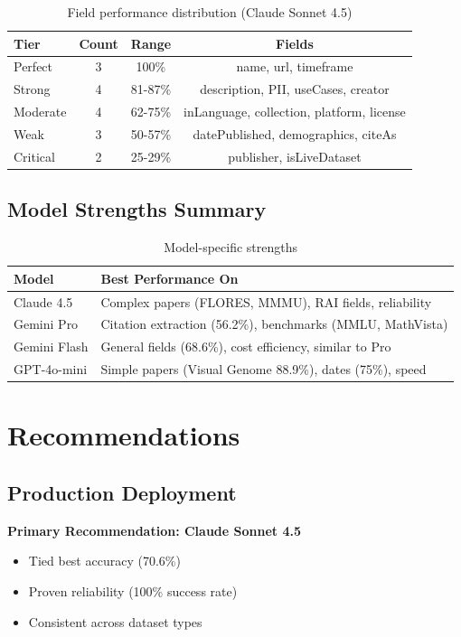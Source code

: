 \documentclass[11pt,a4paper]{article}
\begin{document}
\begin{table}[h]
\centering
\begin{tabular}{lccc}
\toprule
\textbf{Tier} & \textbf{Count} & \textbf{Range} & \textbf{Fields} \\
\midrule
Perfect & 3 & 100\% & name, url, timeframe \\
Strong & 4 & 81-87\% & description, PII, useCases, creator \\
Moderate & 4 & 62-75\% & inLanguage, collection, platform, license \\
Weak & 3 & 50-57\% & datePublished, demographics, citeAs \\
Critical & 2 & 25-29\% & publisher, isLiveDataset \\
\bottomrule
\end{tabular}
\caption{Field performance distribution (Claude Sonnet 4.5)}
\end{table}

\subsection{Model Strengths Summary}

\begin{table}[h]
\centering
\begin{tabular}{lp{10cm}}
\toprule
\textbf{Model} & \textbf{Best Performance On} \\
\midrule
Claude 4.5 & Complex papers (FLORES, MMMU), RAI fields, reliability \\
Gemini Pro & Citation extraction (56.2\%), benchmarks (MMLU, MathVista) \\
Gemini Flash & General fields (68.6\%), cost efficiency, similar to Pro \\
GPT-4o-mini & Simple papers (Visual Genome 88.9\%), dates (75\%), speed \\
\bottomrule
\end{tabular}
\caption{Model-specific strengths}
\end{table}

\section{Recommendations}

\subsection{Production Deployment}

\textbf{Primary Recommendation: Claude Sonnet 4.5}
\begin{itemize}
    \item Tied best accuracy (70.6\%)
    \item Proven reliability (100\% success rate)
    \item Consistent across dataset types
\end{itemize}
\end{document}
